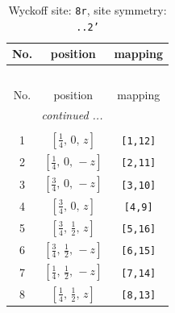 \documentclass[fleqn,8pt]{jsarticle}
\begin{document}
\begin{longtable}{ccc}
\caption{Wyckoff site: {\tt 8r}, site symmetry: {\tt ..2'}}
 \\
 \hline \hline
No. & position & mapping \\ \hline \endfirsthead

\multicolumn{2}{l}{\tablename\ \thetable{}} \\
 \hline \hline
No. & position & mapping \\ \hline \endhead

 \hline \hline
\multicolumn{2}{r}{\footnotesize\it continued ...} \\ \endfoot

 \hline \hline
\multicolumn{2}{r}{} \\ \endlastfoot

1 & $\left[ \frac{1}{4},\, 0,\, z \right]$ & {\tt [1,12]} \\ \hline
2 & $\left[ \frac{1}{4},\, 0,\, - z \right]$ & {\tt [2,11]} \\ \hline
3 & $\left[ \frac{3}{4},\, 0,\, - z \right]$ & {\tt [3,10]} \\ \hline
4 & $\left[ \frac{3}{4},\, 0,\, z \right]$ & {\tt [4,9]} \\ \hline
5 & $\left[ \frac{3}{4},\, \frac{1}{2},\, z \right]$ & {\tt [5,16]} \\ \hline
6 & $\left[ \frac{3}{4},\, \frac{1}{2},\, - z \right]$ & {\tt [6,15]} \\ \hline
7 & $\left[ \frac{1}{4},\, \frac{1}{2},\, - z \right]$ & {\tt [7,14]} \\ \hline
8 & $\left[ \frac{1}{4},\, \frac{1}{2},\, z \right]$ & {\tt [8,13]} \\
\end{longtable}
\renewcommand{\arraystretch}{1.2}
\end{document}
